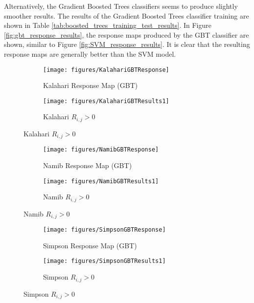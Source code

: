 Alternatively, the Gradient Boosted Trees classifiers seems to produce slightly smoother results. The results of the Gradient Boosted Trees classifier training are shown in Table \ref{tab:boosted_trees_training_test_results}. In Figure \ref{fig:gbt_response_results}, the response maps produced by the GBT classifier are shown, similar to Figure \ref{fig:SVM_response_results}. It is clear that the resulting response maps are generally better than the SVM model.

\begin{figure}[H]
	\centering
	\begin{subfigure}{0.48\textwidth}
		\centering
		\texttt{[image: figures/KalahariGBTResponse]}
		\caption{Kalahari Response Map (GBT)}
		\label{fig:kalahari_gbt_response}
	\end{subfigure}
	\begin{subfigure}{0.48\textwidth}
		\centering
		\texttt{[image: figures/KalahariGBTResults1]}
		\caption{ Kalahari $R_{i,j} > 0$}
		\label{fig:kalahari_gbt_response_overlay}
	\end{subfigure}
\end{figure}
\begin{figure}[H]
	\ContinuedFloat
	\centering
	\begin{subfigure}{0.48\textwidth}
		\centering
		\texttt{[image: figures/NamibGBTResponse]}
		\caption{Namib Response Map (GBT)}
		\label{fig:namib_gbt_response}
	\end{subfigure}
	\begin{subfigure}{0.48\textwidth}
		\centering
		\texttt{[image: figures/NamibGBTResults1]}
		\caption{ Namib $R_{i,j} > 0$}
		\label{fig:namib_gbt_response_overlay}
	\end{subfigure}
\end{figure}
\begin{figure}[H]
	\ContinuedFloat
	\centering
	\begin{subfigure}{0.48\textwidth}
		\centering
		\texttt{[image: figures/SimpsonGBTResponse]}
		\caption{Simpson Response Map (GBT)}
		\label{fig:simpson_gbt_response}
	\end{subfigure}
	\begin{subfigure}{0.48\textwidth}
		\centering
		\texttt{[image: figures/SimpsonGBTResults1]}
		\caption{ Simpson $R_{i,j} > 0$}
		\label{fig:simpson_gbt_response_overlay}
	\end{subfigure}
\end{figure}
